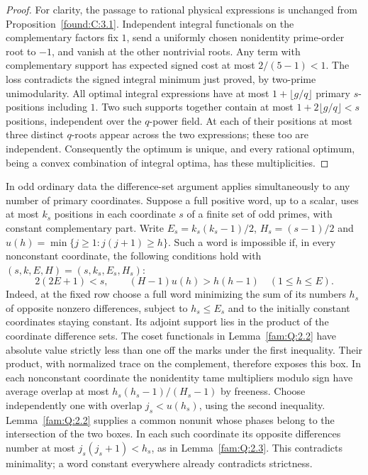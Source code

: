 \documentclass[11pt,a4paper]{article}
\numberwithin{equation}{section}
\theoremstyle{remark}
\begin{document}
\begin{proof}
For clarity, the passage to rational physical expressions is unchanged
from Proposition~\ref{found:C:3.1}. Independent integral functionals on the
complementary factors fix $1$, send a uniformly chosen nonidentity
prime-order root to $-1$, and vanish at the other nontrivial roots.
Any term with complementary support has expected signed cost at most
$2/(5-1)<1$. The loss contradicts the signed integral minimum just
proved, by two-prime unimodularity. All optimal integral expressions
have at most $1+\lfloor g/q\rfloor$ primary $s$-positions including
$1$. Two such supports together contain at most
$1+2\lfloor g/q\rfloor<s$ positions, independent over the $q$-power
field. At each of their positions at most three distinct $q$-roots
appear across the two expressions; these too are independent.
Consequently the optimum is unique, and every rational optimum,
being a convex combination of integral optima, has these multiplicities.
\end{proof}

In odd ordinary data the difference-set argument applies simultaneously
to any number of primary coordinates. Suppose a full positive word,
up to a scalar, uses at most $k_s$ positions in each coordinate $s$
of a finite set of odd primes, with constant complementary part.
Write $E_s=k_s(k_s-1)/2$, $H_s=(s-1)/2$ and
$u(h)=\min\{j\ge1:j(j+1)\ge h\}$. Such a word is impossible if,
in every nonconstant coordinate, the following conditions hold
with $(s,k,E,H)=(s,k_s,E_s,H_s)$:
\begin{equation}\label{found:J:eq:exposure}
        2(2E+1)<s,\qquad
        (H-1)u(h)>h(h-1)\quad(1\le h\le E).
\end{equation}
Indeed, at the fixed row choose a full word minimizing the sum of its
numbers $h_s$ of opposite nonzero differences, subject to $h_s\le E_s$
and to the initially constant coordinates staying constant. Its adjoint
support lies in the product of the coordinate difference sets. The
coset functionals in Lemma~\ref{fam:Q:2.2} have absolute value strictly
less than one off the marks under the first inequality. Their product,
with normalized trace on the complement, therefore exposes this box.
In each nonconstant coordinate the nonidentity tame multipliers modulo
sign have average overlap at most $h_s(h_s-1)/(H_s-1)$ by freeness.
Choose independently one with overlap $j_s<u(h_s)$, using the second
inequality. Lemma~\ref{fam:Q:2.2} supplies a common nonunit whose
phases belong to the intersection of the two boxes. In each such
coordinate its opposite differences number at most $j_s(j_s+1)<h_s$,
as in Lemma~\ref{fam:Q:2.3}. This contradicts minimality; a word
constant everywhere already contradicts strictness.
\end{document}
